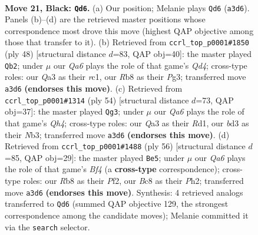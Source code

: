 \documentclass[11pt]{article}
\begin{document}
\clearpage

\begin{figure}[p]\centering
\begin{subfigure}{0.46\textwidth}\centering
\resizebox{\linewidth}{!}{%
\newchessgame
\chessboard[
  setfen={1rb1k2r/p1p2pp1/2p1p2p/8/8/q2B1Q2/P1P5/R2KR3 b k - 1 21},
  showmover=false,
  pgfstyle=straightmove, color=movearrow, markmove={a3-d6}
]}
\caption{}
\end{subfigure}\hfill
\begin{subfigure}{0.46\textwidth}\centering
\resizebox{\linewidth}{!}{%
\newchessgame
\chessboard[
  setfen={4k3/ppqb1p2/8/3pPp2/3Q1P1P/PP4P1/3K4/2r2B1R w - - 2 25},
  showmover=false,
  pgfstyle=straightmove, color=movearrow, markmove={d4-b2}
]}
\caption{}
\end{subfigure}
\\[4pt]
\begin{subfigure}{0.46\textwidth}\centering
\resizebox{\linewidth}{!}{%
\newchessgame
\chessboard[
  setfen={2r2r1k/pp5p/8/3q4/5P1Q/1NbpP3/P5PP/3R1R1K w - - 1 28},
  showmover=false,
  pgfstyle=straightmove, color=movearrow, markmove={h4-g3}
]}
\caption{}
\end{subfigure}\hfill
\begin{subfigure}{0.46\textwidth}\centering
\resizebox{\linewidth}{!}{%
\newchessgame
\chessboard[
  setfen={r5k1/1p3pp1/3P3p/1qp5/4QB2/P5Pb/1P3P1P/3R2K1 w - - 0 29},
  showmover=false,
  pgfstyle=straightmove, color=movearrow, markmove={f4-e5}
]}
\caption{}
\end{subfigure}
\caption{\textbf{Move 21, Black: \texttt{Qd6}.} (a) Our position; Melanie plays \texttt{Qd6} (\texttt{a3d6}). Panels (b)--(d) are the retrieved master positions whose correspondence most drove this move (highest QAP objective among those that transfer to it). (b) Retrieved from \texttt{ccrl\_top\_p0001\#1850} (ply 48) [structural distance $d$=83, QAP obj=40]: the master played \texttt{Qb2}; under $\mu$ our \emph{Qa6} plays the role of that game's \emph{Qd4}; cross-type roles: our \emph{Q}a3 as their \emph{r}c1, our \emph{R}b8 as their \emph{P}g3; transferred move \texttt{a3d6} \textbf{(endorses this move)}. (c) Retrieved from \texttt{ccrl\_top\_p0001\#1314} (ply 54) [structural distance $d$=73, QAP obj=37]: the master played \texttt{Qg3}; under $\mu$ our \emph{Qa6} plays the role of that game's \emph{Qh4}; cross-type roles: our \emph{Q}a3 as their \emph{R}d1, our \emph{b}d3 as their \emph{N}b3; transferred move \texttt{a3d6} \textbf{(endorses this move)}. (d) Retrieved from \texttt{ccrl\_top\_p0001\#1488} (ply 56) [structural distance $d$=85, QAP obj=29]: the master played \texttt{Be5}; under $\mu$ our \emph{Qa6} plays the role of that game's \emph{Bf4} (a \textbf{cross-type} correspondence); cross-type roles: our \emph{R}b8 as their \emph{P}f2, our \emph{B}c8 as their \emph{P}h2; transferred move \texttt{a3d6} \textbf{(endorses this move)}. Synthesis: 4 retrieved analogs transferred to \texttt{Qd6} (summed QAP objective 129, the strongest correspondence among the candidate moves); Melanie committed it via the \texttt{search} selector.}
\label{fig:thought-m41}
\end{figure}
\end{document}
